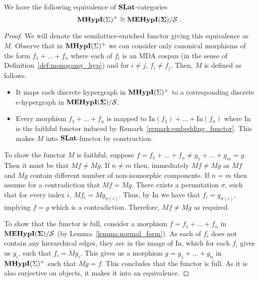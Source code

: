 \begin{lemma}

    We have the following equivalence of $\mathbf{SLat}$-categories
    \[
    \textbf{MHypI}(\Sigma)^{+} \cong {\mathbf{MEHypI(\Sigma)}}/\mathcal{S}~.
    \]
    \end{lemma}
    \begin{proof}
    We will denote the semilattice-enriched functor giving this equivalence as $M$.
    Observe that in $\textbf{MHypI}(\Sigma)^{+}$ we can consider only canonical morphisms of the form $f_{1} + \ldots + f_{n}$ where each of $f_{i}$ is an MDA cospan (in the sense of Definition~\ref{def:monogamy_hyp}) and for $i \not = j$, $f_{i} \not = f_{j}$.
    Then, $M$ is defined as follows.
    \begin{itemize}
    \item It maps each discrete hypergraph in $\textbf{MHypI}(\Sigma)^{+}$ to a corresponding discrete e-hypergraph in ${\mathbf{MEHypI(\Sigma)}}/\mathcal{S}$.
    \item Every morphism $f_{1} + \ldots + f_{n}$ is mapped to $\text{In}(f_{1}) + \ldots + \text{In}(f_{n})$ where $\text{In}$ is the faithful functor induced by Remark~\ref{remark:embedding_functor}.
          This makes $M$ into $\mathbf{SLat}$-functor by construction.
    \end{itemize}
    To show the functor $M$ is faithful, suppose $f = f_{1} + \ldots + f_{n} \not = g_{1} + \ldots + g_{m} = g$.
    Then it must be that $Mf \not = Mg$.
    If $n \not = m$ then, immediately $Mf \not = Mg$ as $Mf$ and $Mg$ contain different number of non-isomorphic components.
    If $n = m$ then assume for a contradiction that $Mf = Mg$. 
    There exists a permutation $\sigma$, such that for every index $i$, $Mf_{i} = Mg_{\sigma(i)}$.
    Thus, by $\text{In}$ we have that $f_{i} = g_{\sigma(i)}$, implying $f = g$ which is a contradiction.
    Therefore, $Mf \not = Mg$ as required.
    
    To show that the functor is full, consider a morphism $f = f_{1} + \ldots + f_{n}$ in ${\mathbf{MEHypI(\Sigma)}} / \mathcal{S}$ (by Lemma~\ref{lemma:normal_form}). 
    As each of $f_{i}$ does not contain any hierarchical edges, they are in the image of $\text{In}$, which for each $f_{i}$ gives us $g_{i}$, such that $f_{i} = Mg_{i}$.
    This gives us a morphism $g = g_{1} + \ldots + {g_{n}}$ in $\textbf{MHypI}(\Sigma)^{+}$ such that $Mg = f$.
    This concludes that the functor is full.
    As it is also surjective on objects, it makes it into an equivalence.
\end{proof}
    

